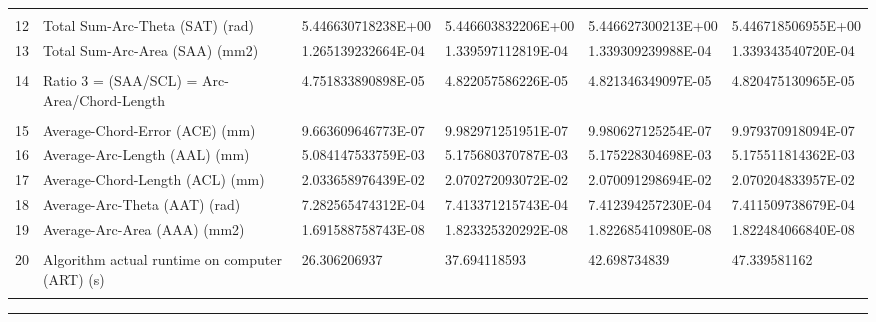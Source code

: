 \begin{landscape}
\begin{table}[ht]
{\begin{tabular}{ p{0.2cm} p{8.80cm} p{4.00cm} p{4.0cm} p{4.00cm} p{4.0cm}}
&		&		&		&		&		\\
12	&	Total Sum-Arc-Theta (SAT) (rad)	&	5.446630718238E+00	&	5.446603832206E+00	&	5.446627300213E+00	&	5.446718506955E+00	\\
13	&	Total Sum-Arc-Area (SAA) (mm2)	&	1.265139232664E-04	&	1.339597112819E-04	&	1.339309239988E-04	&	1.339343540720E-04	\\
&		&		&		&		&		\\
14	&	Ratio 3 = (SAA/SCL) = Arc-Area/Chord-Length	&	4.751833890898E-05	&	4.822057586226E-05	&	4.821346349097E-05	&	4.820475130965E-05	\\
&		&		&		&		&		\\
15	&	Average-Chord-Error (ACE) (mm)	&	9.663609646773E-07	&	9.982971251951E-07	&	9.980627125254E-07	&	9.979370918094E-07	\\
16	&	Average-Arc-Length (AAL) (mm)	&	5.084147533759E-03	&	5.175680370787E-03	&	5.175228304698E-03	&	5.175511814362E-03	\\
17	&	Average-Chord-Length (ACL) (mm)	&	2.033658976439E-02	&	2.070272093072E-02	&	2.070091298694E-02	&	2.070204833957E-02	\\
18	&	Average-Arc-Theta (AAT) (rad)	&	7.282565474312E-04	&	7.413371215743E-04	&	7.412394257230E-04	&	7.411509738679E-04	\\
19	&	Average-Arc-Area (AAA) (mm2)	&	1.691588758743E-08	&	1.823325320292E-08	&	1.822685410980E-08	&	1.822484066840E-08	\\
&		&		&		&		&		\\
20	&	Algorithm actual runtime on computer (ART) (s) 	&	26.306206937	&	37.694118593	&	42.698734839	&	47.339581162	\\
&		&		&		&		&		

\end{tabular}
			
}   %
\hrule
\end{table}
\end{landscape}


